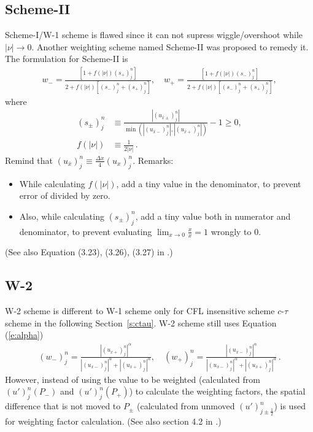 \documentclass[letterpaper,12pt,dvips]{article}
\numberwithin{equation}{section}
\begin{document}
\subsection{Scheme-II}

Scheme-I/W-1 scheme is flawed since it can not supress wiggle/overshoot 
while $|\nu|\rightarrow0$.
Another weighting scheme named Scheme-II was proposed to remedy it.
The formulation for Scheme-II is
\begin{align}
  w_- = \frac{[1+f(|\nu|)(s_+)_j^n]}
             {2 + f(|\nu|)[(s_-)_j^n+(s_+)_j^n]}, \quad
  w_+ = \frac{[1+f(|\nu|)(s_-)_j^n]}
             {2 + f(|\nu|)[(s_-)_j^n+(s_+)_j^n]}, \label{e:Scheme-II}
\end{align}
where 
\begin{align}
  (s_{\pm})_j^n &\equiv 
    \frac{|(u_{\bar{x}\pm})_j^n|}
         {\min\left(|(u_{\bar{x}-})_j^n|, 
                    |(u_{\bar{x}+})_j^n|\right)} - 1 
    \ge 0, \label{e:Scheme-IIs} \\
  f(|\nu|) &\equiv 
    \frac{1}{2|\nu|}\,. \label{e:Scheme-IIf}
\end{align}
Remind that $(u_{\bar{x}})_j^n\equiv \frac{\Delta x}{4}(u_x)_j^n$.
Remarks:
\begin{itemize}
\item While calculating $f(|\nu|)$, add a tiny value in the denominator, 
to prevent error of divided by zero.
\item Also, while calculating $(s_{\pm})_j^n$, add a tiny value both in 
numerator and denominator, to prevent evaluating 
$\lim_{x\rightarrow0}\frac{x}{x}=1$ wrongly to 0.
\end{itemize}
(See also Equation (3.23), (3.26), (3.27) in \cite{b:chang02}.)

\subsection{W-2}

W-2 scheme is different to W-1 scheme only for CFL insensitive scheme 
$c$-$\tau$ scheme in the following Section~\ref{s:ctau}.
W-2 scheme still uses Equation (\ref{e:alpha})
\begin{align*}
  (w_-)_j^n = 
    \frac{|(u_{x+})_j^n|^{\alpha}}
         {|(u_{x-})_j^n|^{\alpha}+|(u_{x+})_j^n|^{\alpha}}, \quad
  (w_+)_j^n = 
    \frac{|(u_{x-})_j^n|^{\alpha}}
         {|(u_{x-})_j^n|^{\alpha}+|(u_{x+})_j^n|^{\alpha}}\,.
\end{align*}
However, instead of using the value to be weighted (calculated from 
$(u')_j^n(P_-)$ and $(u')_j^n(P_+)$) to calculate the weighting factors, 
the spatial difference that is not moved to $P_{\pm}$ (calculated from 
unmoved $(u')_{j\pm\frac{1}{2}}^n$) is used for weighting factor 
calculation.
(See also section 4.2 in \cite{b:chang03}.)
\end{document}
